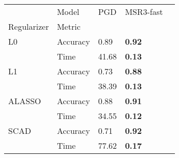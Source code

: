 \begin{tabular}{lllll}
\toprule
     & Model &    PGD &    MSR3-fast \\
Regularizer & Metric &        &        &       \\
\midrule
L0 & Accuracy &   0.89 &  \textbf{0.92} \\
     & Time &  41.68 &  \textbf{0.13} \\
L1 & Accuracy &   0.73 &   \textbf{0.88} \\
     & Time &  38.39 &   \textbf{0.13} \\
ALASSO & Accuracy &   0.88 &   \textbf{0.91} \\
     & Time &  34.55 &  \textbf{0.12} \\
SCAD & Accuracy &   0.71 &  \textbf{0.92} \\
     & Time &  77.62 &  \textbf{0.17} \\
\bottomrule
\end{tabular}
